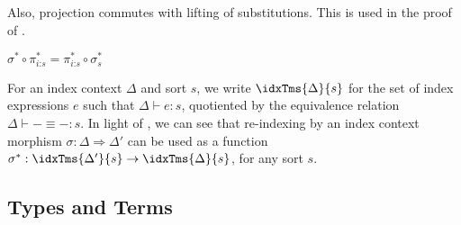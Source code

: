 Also, projection commutes with lifting of substitutions. This is used
in the proof of .
\begin{lemma}
  $\sigma^* \circ \pi^*_{i\mathord:s} = \pi^*_{i\mathord:s} \circ \sigma^*_s$
\end{lemma}

For an index context $\Delta$ and sort $s$, we write
$\idxTms{\Delta}{s}$ for the set of index expressions $e$ such that
$\Delta \vdash e : s$, quotiented by the equivalence relation $\Delta
\vdash - \equiv - : s$. In light of , we can
see that re-indexing by an index context morphism $\sigma : \Delta
\Rightarrow \Delta'$ can be used as a function $\sigma^* :
\idxTms{\Delta'}{s} \to \idxTms{\Delta}{s}$, for any sort $s$.

\subsection{Types and Terms}\label{sec:types-and-terms}

